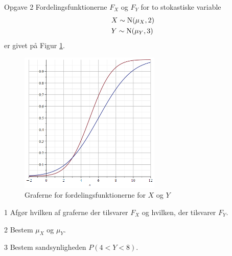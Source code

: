 \documentclass[12pt,x11names,a4paper]{article}
\begin{document}
\begin{opgavetekst}{Opgave 2}
	Fordelingsfunktionerne $F_X$ og $F_Y$ for to stokastiske variable
	\begin{align*}
		&X \sim \textnormal{N}(\mu_X,2)\\
		&Y \sim \textnormal{N}(\mu_Y,3)
	\end{align*}
	er givet på Figur \ref{fig:fordeling}.
	\begin{figure}[H]
		\centering
		\includegraphics[width=0.6\textwidth]{Billeder/fordelinger}
		\caption{Graferne for fordelingsfunktionerne for $X$ og $Y$}
		\label{fig:fordeling}
	\end{figure}
	\phantom{h}
\end{opgavetekst}
\begin{delopgave}{}{1}
	Afgør hvilken af graferne der tilsvarer $F_X$ og hvilken, der tilsvarer $F_Y$.
\end{delopgave}
\begin{delopgave}{}{2}
	Bestem $\mu_X$ og $\mu_Y$.
\end{delopgave}
\begin{delopgave}{}{3}
	Bestem sandsynligheden $P(4<Y<8)$.
\end{delopgave}
\end{document}
